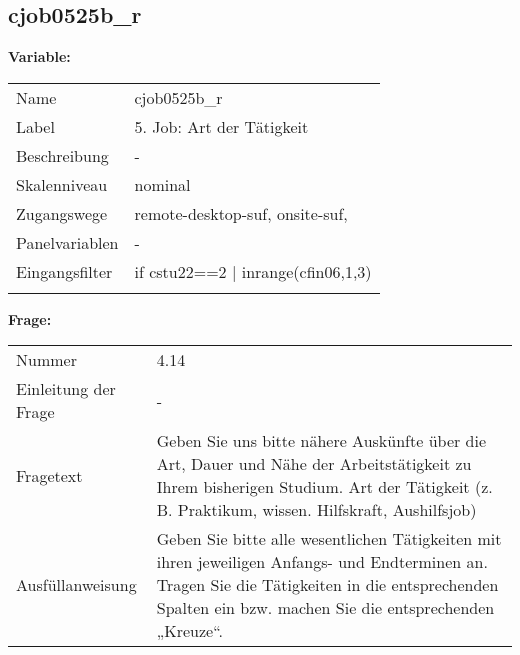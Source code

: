 	
	
	\subsection{cjob0525b\_r}
	\label{subSection:cjob0525b_r}

	\noindent\textbf{Variable:}\\
		\begin{tabular}{lL{11.3cm}}
			\label{tableVariable:cjob0525b_r}
			Name & cjob0525b\_r \\
			Label & 5. Job: Art der Tätigkeit \\
			Beschreibung & - \\
			Skalenniveau & nominal \\
			Zugangswege &
				remote-desktop-suf,
				onsite-suf,
 \\
			Panelvariablen & -
			 \\
			Eingangsfilter & if cstu22==2 | inrange(cfin06,1,3) \\
 \\
		\end{tabular}

		\vspace*{1 cm}
		\noindent\textbf{Frage:}\\
		\begin{tabular}{lL{11.3cm}}
			\label{tableQuestion:cjob0525b_r}
			Nummer & 4.14 \\
			Einleitung der Frage & - \\
			Fragetext & Geben Sie uns bitte nähere Auskünfte über die Art, Dauer und Nähe der Arbeitstätigkeit zu Ihrem bisherigen Studium.
Art der Tätigkeit
(z. B. Praktikum, wissen. Hilfskraft, Aushilfsjob) \\
			Ausfüllanweisung & Geben Sie bitte alle wesentlichen Tätigkeiten mit ihren jeweiligen Anfangs- und Endterminen an. Tragen Sie die Tätigkeiten in die entsprechenden Spalten ein bzw. machen Sie die entsprechenden „Kreuze“. \\
		\end{tabular}





